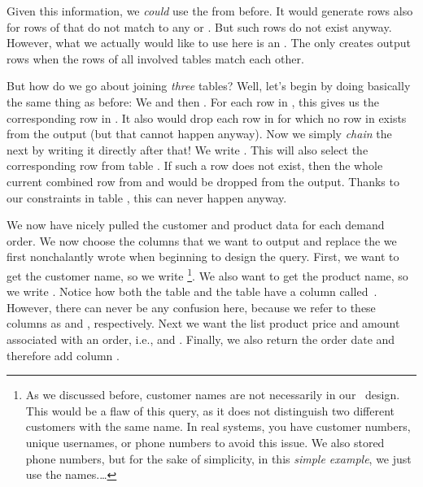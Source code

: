 Given this information, we \emph{could} use the  from before.
It would generate rows also for rows of  that do not match to any  or .
But such rows do not exist anyway.
However, what we actually would like to use here is an .
The  only creates output rows when the rows of all involved tables match each other.%
%
\begin{sloppypar}%
But how do we go about joining \emph{three} tables?
Well, let's begin by doing basically the same thing as before:
We  and then .
For each row in , this gives us the corresponding row in .
It also would drop each row in  for which no row in  exists from the output (but that cannot happen anyway).
Now we simply \emph{chain} the next  by writing it directly after that!
We write .
This will also select the corresponding row from table .
If such a row does not exist, then the whole current combined row from  and  would be dropped from the output.
Thanks to our  constraints in table , this can never happen anyway.%
\end{sloppypar}%
%
\begin{sloppypar}%
We now have nicely pulled the customer and product data for each demand order.
We now choose the columns that we want to output and replace the  we first nonchalantly wrote when beginning to design the query.
First, we want to get the customer name, so we write \footnote{%
As we discussed before, customer names are not necessarily  in our \db\ design. %
This would be a flaw of this query, as it does not distinguish two different customers with the same name. %
In real systems, you have customer numbers, unique usernames, or phone numbers to avoid this issue. %
We also stored phone numbers, but for the sake of simplicity, in this \emph{simple example}, we just use the names.\dots}.
We also want to get the product name, so we write .
Notice how both the table  and the table  have a column called~.
However, there can never be any confusion here, because we refer to these columns as  and , respectively.
Next we want the list product price and amount associated with an order, i.e.,  and .
Finally, we also return the order date and therefore add column .%
\end{sloppypar}%
